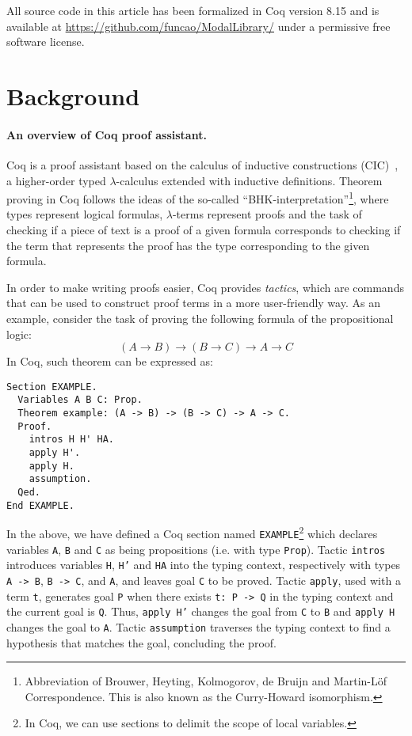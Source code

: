 \documentclass[sigconf]{acmart}
\begin{document}
All source code in this article has been formalized in Coq version 8.15 and
is available at \url{https://github.com/funcao/ModalLibrary/} under a permissive free software license.

\section{Background}\label{sec:background}

\paragraph{An overview of Coq proof assistant.}

Coq is a proof assistant based on the calculus of inductive
constructions (CIC)~\cite{manual_cic}, a higher-order typed
$\lambda$-calculus extended with inductive definitions.  Theorem
proving in Coq follows the ideas of the so-called
``BHK-in\-ter\-pre\-ta\-tion''\footnote{Abbreviation of Brouwer, Heyting,
  Kolmogorov, de Bruijn and Martin-L\"of Correspondence. This is also
  known as the Curry-Howard isomorphism.}, where types represent
logical formulas, $\lambda$-terms represent proofs
\cite{Bertot10} and the task of checking if a piece of text is a
proof of a given formula corresponds to checking if the term that
represents the proof has the type corresponding to the given formula.

In order to make writing proofs easier, Coq provides
\emph{tactics}, which are commands that can be used to construct proof
terms in a more user-friendly way. As an example, consider the task of proving the following 
formula of the propositional logic:
\[
(A \to B)\to (B\to C) \to A \to C
\]
In Coq, such theorem can be expressed as:
\begin{verbatim}
Section EXAMPLE.
  Variables A B C: Prop.
  Theorem example: (A -> B) -> (B -> C) -> A -> C.
  Proof.
    intros H H' HA.
    apply H'.
    apply H.
    assumption. 
  Qed.
End EXAMPLE.
\end{verbatim}
In the above, we have defined a Coq section named
\texttt{EXAMPLE}\footnote{In Coq, we can use sections to delimit the
  scope of local variables.} which declares variables \texttt{A},
\texttt{B} and \texttt{C} as being propositions (i.e. with type
\texttt{Prop}). Tactic \texttt{intros} introduces variables
\texttt{H}, \texttt{H'} and \texttt{HA} into the typing context,
respectively with types \texttt{A -> B}, \texttt{B -> C}, and
\texttt{A}, and leaves goal \texttt{C} to be proved. Tactic
\texttt{apply}, used with a term \texttt{t}, generates goal
\texttt{P}
when there exists \texttt{t: P -> Q} in the typing context and the
current goal is \texttt{Q}. Thus, \texttt{apply H'} changes the goal
from \texttt{C} to \texttt{B} and \texttt{apply H}
changes the goal to \texttt{A}. Tactic \texttt{assumption}
traverses the typing context to find a hypothesis that matches the goal,
concluding the proof.
\end{document}
